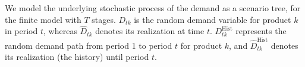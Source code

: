 \documentclass[11pt]{article}
\newcommand{\ti}{t} %
\newcommand{\TI}{\mathcal{T}}
\newcommand{\Ti}{T}
\newcommand{\ka}{k} %
\newcommand{\jey}{j} %
\newcommand{\Bi}{B} %
\newcommand{\Vi}{v} %
\newcommand{\cn}{\mathcal{C}(n) }
\begin{document}
 
 












We model the underlying stochastic process of the demand as a scenario tree, for the finite model with $\Ti$ stages. 
$D_{\ti \ka}$ is the random demand variable for product $\ka$ in period $\ti$, whereas $\hat{D}_{\ti \ka}$ denotes its realization at time $\ti$.
$D^\text{Hist}_{\ti \ka}$ represents the random demand path from period 1 to period $\ti$ for product $\ka$, and $\hat{D}^\text{Hist}_{\ti\ka}$ denotes its realization (the history) until period $\ti$.
\end{document}
